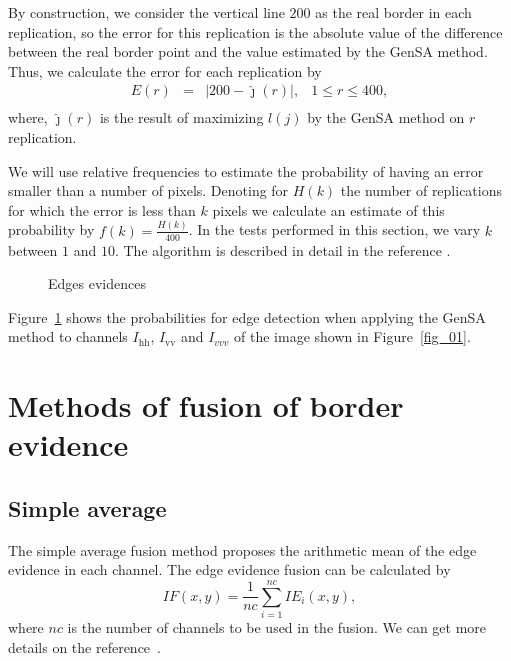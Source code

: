 \documentclass[conference]{IEEEtran}
\begin{document}
     By construction, we consider the vertical line $200$ as the real border in each replication, so the error for this replication is the absolute value of the difference between the real border point and the value estimated by the GenSA method. Thus, we calculate the error for each replication by
\begin{equation}\label{eq_12}
\begin{array}{llll}
	E(r) &=& |200 - \hat{\jmath}(r)|, & 1\leq r \leq 400,  \\
\end{array}
\end{equation}
where, $\hat{\jmath}(r)$ is the result of maximizing $l(j)$ by the GenSA method on $r$ replication.

We will use relative frequencies to estimate the probability of having an error smaller than a number of pixels. Denoting for $H(k)$ the number of replications for which the error is less than $k$ pixels we calculate an estimate of this probability by $f(k)=\frac{H(k)}{400}$. In the tests performed in this section, we vary $k$ between $1$ and $10$. The algorithm is described in detail in the reference \cite{fbgm}. 
\begin{figure}[!ht]
     \centering
     \caption{Edges evidences}
     \label{fig_03}
   \end{figure}	
   
Figure~\ref{fig_03} shows the probabilities for edge detection when applying the GenSA method to channels $I_\text{hh}$, $I_\text{vv}$ and $I_{vvv}$ of the image shown in Figure~\ref{fig_01}. 


\section{Methods of fusion of border evidence}\label{sec_06}
\subsection{Simple average}
The simple average fusion method proposes the arithmetic mean of the edge evidence in each channel. The edge evidence fusion can be calculated by
\begin{equation}
	IF(x,y)=\frac{1}{nc}\sum_{i=1}^{nc}IE_i(x,y),
\end{equation}
where $nc$ is the number of channels to be used in the fusion. We can get more details on the reference~\cite{mit}.
\end{document}
